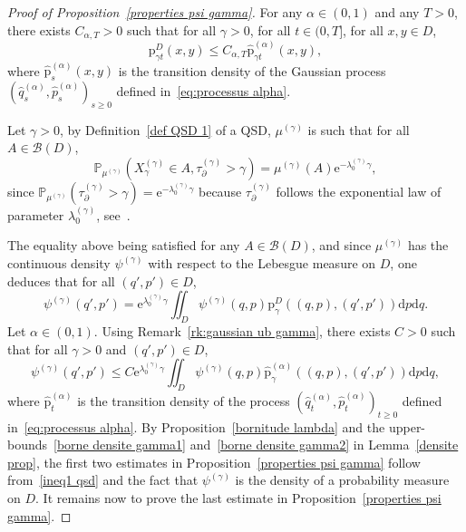 \documentclass[preprint,EJP]{ejpecp}
\begin{document}
\begin{proof}[Proof of Proposition~\ref{properties psi gamma}]
For any $\alpha\in (0,1)$ and any $T>0$, there exists $C_{\alpha,T}>0$ such that for all $\gamma>0$, for all $t\in(0,T]$, for all $x,y\in D$,
\begin{equation}\label{Gaussian ub} 
    \mathrm{p}^D_{\gamma t}(x,y)\leq C_{\alpha,T} \widehat{\mathrm{p}}^{(\alpha)}_{\gamma t}(x,y),
\end{equation}
where $\widehat{\mathrm{p}}^{(\alpha)}_{s}(x,y)$ is the transition density
of the Gaussian process
 $(\widehat{q}^{(\alpha)}_s, \widehat{p}^{(\alpha)}_s)_{s \geq 0}$ defined in~\eqref{eq:processus alpha}.  

Let $\gamma>0$, by Definition~\ref{def QSD 1} of a QSD, $\mu^{(\gamma)}$ is such that for all $A\in\mathcal{B}(D)$,  
$$\mathbb{P}_{\mu^{(\gamma)}}(X^{(\gamma)}_\gamma\in A, \tau^{(\gamma)}_\partial>\gamma)=\mu^{(\gamma)}(A)\mathrm{e}^{-\lambda_0^{(\gamma)}\gamma},$$ since $\mathbb{P}_{\mu^{(\gamma)}}(\tau^{(\gamma)}_\partial>\gamma)=\mathrm{e}^{-\lambda_0^{(\gamma)}\gamma}$ because $\tau^{(\gamma)}_\partial$ follows the exponential law of parameter $\lambda_0^{(\gamma)}$, see~\cite[Theorem 2.13]{LelRamRey2}. 

The equality above being satisfied for any $A\in\mathcal{B}(D)$, and since $\mu^{(\gamma)}$ has the continuous density $\psi^{(\gamma)}$ with respect to the Lebesgue measure on $D$, one deduces that for all $(q',p')\in D$,
$$\psi^{(\gamma)}(q',p')=\mathrm{e}^{\lambda_0^{(\gamma)}\gamma} \iint_{D}\psi^{(\gamma)}(q,p) \mathrm{p}^D_{\gamma}((q,p),(q',p')) \mathrm{d}p \mathrm{d}q .$$  
Let $\alpha\in(0,1)$. Using Remark~\ref{rk:gaussian ub gamma}, there exists $C>0$ such that for all $\gamma>0$ and $(q',p')\in D$, 
\begin{equation}\label{ineq1 qsd}
    \psi^{(\gamma)}(q',p')\leq C \mathrm{e}^{\lambda_0^{(\gamma)}\gamma} \iint_{D}\psi^{(\gamma)}(q,p) \widehat{\mathrm{p}}^{(\alpha)}_{\gamma}((q,p),(q',p')) \mathrm{d}p \mathrm{d}q,  
\end{equation}
where $\widehat{\mathrm{p}}^{(\alpha)}_t$ is the transition density of the process $(\widehat{q}^{(\alpha)}_t, \widehat{p}^{(\alpha)}_t)_{t \geq 0}$ defined in~\eqref{eq:processus alpha}. By Proposition~\ref{bornitude lambda} and the upper-bounds~\eqref{borne densite gamma1} and~\eqref{borne densite gamma2} in Lemma~\ref{densite prop}, the first two estimates in Proposition~\ref{properties psi gamma} follow from~\eqref{ineq1 qsd} and the fact that $\psi^{(\gamma)}$ is the density of a probability measure on $D$. It remains now to prove the last estimate in Proposition~\ref{properties psi gamma}. 


\end{proof}
\end{document}
